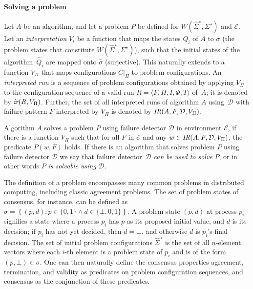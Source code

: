 \documentclass[11pt]{article}
\newcommand{\ident}[1]{\textit{#1}\rule{0cm}{1ex}}
\newcommand{\E}{\mathcal{E}}
\newcommand{\D}{\mathcal{D}}
\newcommand{\setConf}{\Sigma^\star}
\newcommand{\initSetConf}{\hat{\Sigma}^\star}
\newcommand{\seqprobconf}{W(\initSetConf,\setConf)}
\newcommand{\problem}{P} \newcommand{\Alg}{A}
\begin{document}
\paragraph{Solving a problem}

Let $\Alg$ be an algorithm, and let a problem $\problem$ be defined
     for $\seqprobconf$ and $\E$.
Let an \emph{interpretation} $V_i$ be a function that maps the states
     $Q_i$ of $\Alg$ to $\sigma$ (the problem states that constitute
     $\seqprobconf$), such that the initial states of the
     algorithm~$\hat{Q}_i$ are mapped onto $\hat{\sigma}$
     (surjective).
This naturally extends to a function $V_\Pi$ that maps configurations
     $C|_\Pi$ to problem configurations.
An \emph{interpreted run} is a sequence of problem configurations
     obtained by applying  $V_\Pi$ to the configuration sequence of a
     valid run $R=\langle F, H, I, \Phi, T \rangle$ of~$\Alg$; it is
     denoted by $\ident{ir}(R,V_\Pi)$.
Further, the set of all interpreted runs of algorithm $\Alg$
     using~$\D$ with failure pattern $F$ interpreted by $V_\Pi$ is
     denoted by $\ident{IR}(\Alg,F,\D,V_\Pi)$.

Algorithm $\Alg$ solves a problem $\problem$ using failure detector
     $\D$ in environment $\E$, if there is a function $V_\Pi$  such
     that for all $F$ in $\E$ and any $w \in
     \ident{IR}(\Alg,F,\D,V_\Pi)$,  the predicate $P(w,F)$ holds.
If there is an algorithm that solves problem $\problem$ using failure
     detector $\D$ we say that failure detector~$\D$ \emph{can be used
     to solve} $\problem$, or in other words $\problem$ \emph{is
     solvable using} $\D$.

\medskip

The definition of a problem encompasses many common problems in distributed computing, including classic agreement problems.
The set of problem states of consensus, for instance, can be defined
     as $\sigma = \left\{(p,d)\colon p\in\{0,1\} \wedge
     d\in\{\bot,0,1\}\right\}$. A problem state $(p,d)$ at process $p_i$ signifies a state where a process $p_i$ has
     $p$ as its proposed initial value, and $d$ is its decision; if $p_i$ has not yet decided, then 
     $d=\bot$, and otherwise $d$ is $p_i$'s final decision.
The set of initial problem configurations $\initSetConf$ is the set of
     all $n$-element vectors where each $i$-th element is a problem state of $p_i$ and is of the form $(p,\bot) \in \sigma$.
One can then naturally define the consensus properties agreement,
     termination, and validity as predicates on problem configuration
     sequences, and consensus as the conjunction of these predicates.
\end{document}
